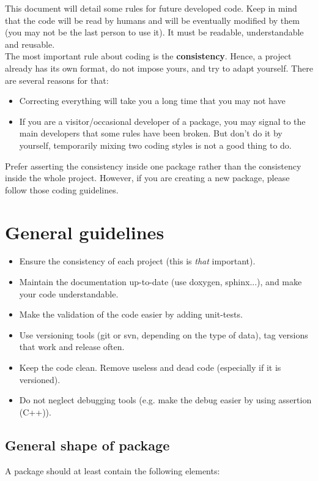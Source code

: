 This document will detail some rules for future developed code.
Keep in mind that the code will be read by humans and will be eventually modified by them (you may not be the last person to use it). 
It must be readable, understandable and reusable.\\

The most important rule about coding is the \textbf{consistency}.
Hence, a project already has its own format, do not impose yours, and try to adapt yourself.
There are several reasons for that:
\begin{itemize}
\item Correcting everything will take you a long time that you may not have
\item If you are a visitor/occasional developer of a package, you may signal to the main developers that some rules have been broken. But don't do it by yourself, temporarily mixing two coding styles is not a good thing to do.
\end{itemize}
Prefer asserting the consistency inside one package rather than the consistency inside the whole project.
However, if you are creating a new package, please follow those coding guidelines.

\chapter{General guidelines}
\label{section:general-guidelines}
\begin{itemize}
\item Ensure the consistency of each project (this is \textit{that} important).
\item Maintain the documentation up-to-date (use doxygen, sphinx...), and make your code understandable.
\item Make the validation of the code easier by adding unit-tests.
\item Use versioning tools (git or svn, depending on the type of data), tag versions that work and release often.
\item Keep the code clean. Remove useless and dead code (especially if it is versioned).
\item Do not neglect debugging tools (e.g. make the debug easier by using assertion (C++)).
\end{itemize}

\section{General shape of package}
A package should at least contain the following elements:
